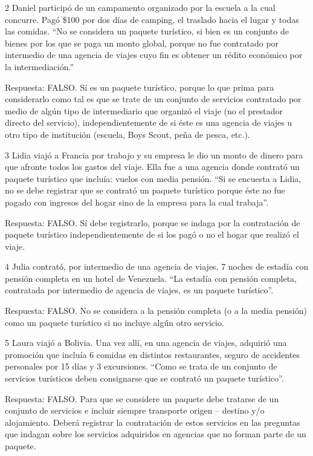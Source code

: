 \documentclass[
  openany]{book}
\begin{document}
2 Daniel participó de un campamento organizado por la escuela a la cual concurre. Pagó \$100 por dos días de camping, el traslado hacia el lugar y todas las comidas. ``No se considera un paquete turístico, si bien es un conjunto de bienes por los que se paga un monto global, porque no fue contratado por intermedio de una agencia de viajes cuyo fin es obtener un rédito económico por la intermediación.''

Respuesta: FALSO. Sí es un paquete turístico, porque lo que prima para considerarlo como tal es que se trate de un conjunto de servicios contratado por medio de algún tipo de intermediario que organizó el viaje (no el prestador directo del servicio), independientemente de si éste es una agencia de viajes u otro tipo de institución (escuela, Boys Scout, peña de pesca, etc.).

3 Lidia viajó a Francia por trabajo y su empresa le dio un monto de dinero para que afronte todos los gastos del viaje. Ella fue a una agencia donde contrató un paquete turístico que incluía: vuelos con media pensión.
``Si se encuesta a Lidia, no se debe registrar que se contrató un paquete turístico porque éste no fue pagado con ingresos del hogar sino de la empresa para la cual trabaja''.

Respuesta: FALSO. Sí debe registrarlo, porque se indaga por la contratación de paquete turístico independientemente de si los pagó o no el hogar que realizó el viaje.

4 Julia contrató, por intermedio de una agencia de viajes, 7 noches de estadía con pensión completa en un hotel de Venezuela.
``La estadía con pensión completa, contratada por intermedio de agencia de viajes, es un paquete turístico''.

Respuesta: FALSO. No se considera a la pensión completa (o a la media pensión) como un paquete turístico si no incluye algún otro servicio.

5 Laura viajó a Bolivia. Una vez allí, en una agencia de viajes, adquirió una promoción que incluía 6 comidas en distintos restaurantes, seguro de accidentes personales por 15 días y 3 excursiones.
``Como se trata de un conjunto de servicios turísticos deben consignarse que se contrató un paquete turístico''.

Respuesta: FALSO. Para que se considere un paquete debe tratarse de un conjunto de servicios e incluir siempre transporte origen -- destino y/o alojamiento. Deberá registrar la contratación de estos servicios en las preguntas que indagan sobre los servicios adquiridos en agencias que no forman parte de un paquete.
\end{document}

